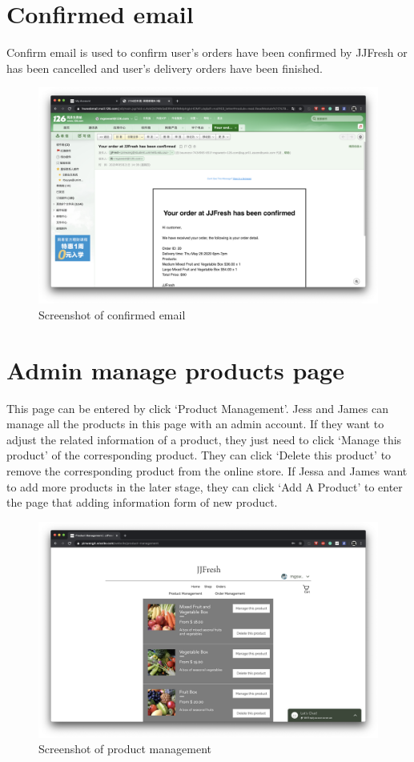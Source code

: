 \clearpage
\section*{Confirmed email}
Confirm email is used to confirm user’s orders have been confirmed by JJFresh or has been cancelled and user’s delivery orders have been finished.
\begin{figure}[htp]
\centering
\includegraphics[width=\textwidth]{Figures/confirmedEmail.png}
\caption{Screenshot of confirmed email}
\label{fig:confirmedEmail}
\end{figure}

\clearpage
\section*{Admin manage products page}
This page can be entered by click ‘Product Management’. Jess and James can manage all the products in this page with an admin account. If they want to adjust the related information of a product, they just need to click ‘Manage this product’ of the corresponding product. They can click ‘Delete this product’ to remove the corresponding product from the online store.
If Jessa and James want to add more products in the later stage, they can click ‘Add A Product’ to enter the page that adding information form of new product.
\begin{figure}[htp]
\centering
\includegraphics[width=\textwidth]{Figures/adminProduct.png}
\caption{Screenshot of product management}
\label{fig:adminProduct}
\end{figure}

